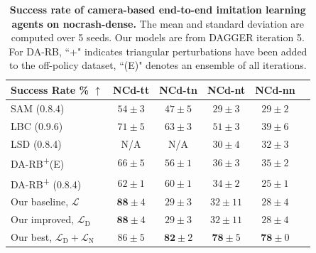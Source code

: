 \begin{table}
	\caption{\textbf{Success rate of camera-based end-to-end imitation learning agents on nocrash-dense.}
		The mean and standard deviation are computed over 5 seeds. 
		Our models are from DAGGER iteration 5. 
		For DA-RB, ``+" indicates triangular perturbations have been added to the off-policy dataset, ``(E)" denotes an ensemble of all iterations.}
	\setlength{\tabcolsep}{6.67pt}
	\centering
	\begin{tabular}{lccccc}
		\hline
		Success Rate \% $\uparrow$
		&  NCd-tt & NCd-tn  & NCd-nt & NCd-nn  \\ 
		\hline
		SAM \cite{zhao2021sam} (0.8.4) & 
		$54 \pm 3$ & $47 \pm 5$ & $29 \pm 3$ & $29 \pm 2$ \\
		LBC \cite{chen2020learning} (0.9.6) & 
		$71 \pm 5$ & $63 \pm 3$ & $51 \pm 3$ & $39 \pm 6$ \\
		LSD \cite{ohn2020learning} (0.8.4) & 
		N/A & N/A & $30 \pm 4$ & $32 \pm 3$ \\
		DA-RB\textsuperscript{+}(E) \cite{prakash2020exploring} & 
		$66 \pm 5$ & $56 \pm 1$ & $36 \pm 3$ & $35 \pm 2$ \\
		DA-RB\textsuperscript{+} \cite{prakash2020exploring} (0.8.4)  & 
		$62 \pm 1$ & $60 \pm 1$ & $34 \pm 2$ & $25 \pm 1$ \\
		Our baseline, $\mathcal{L}$ & 
		$\mathbf{88} \pm 4$ & $29 \pm 3$ & $32 \pm 11$ & $28 \pm 4$ \\
		Our improved, $\mathcal{L}_\text{D} $ & 
		$\mathbf{88} \pm 4$ & $29 \pm 3$ & $32 \pm 11$ & $28 \pm 4$ \\
		Our best, $\mathcal{L}_\text{D}+\mathcal{L}_\text{N}$ & 
		$86 \pm 5$ & $\mathbf{82} \pm 2$ & $\mathbf{78} \pm 5$ & $\mathbf{78} \pm 0$ \\
		\hline
	\end{tabular}
	\vspace{-1ex}
	\label{table:sucess_rate_nc_dense}
	\vspace{-2ex}
\end{table}

